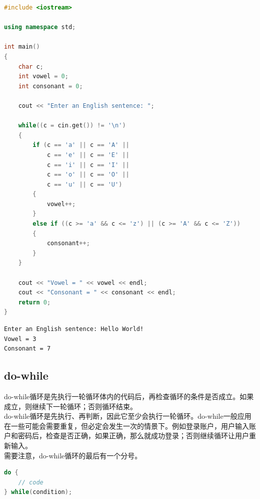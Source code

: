 \vspace{0.5cm}


\begin{lstlisting}[language=C++]
#include <iostream>

using namespace std;

int main()
{
    char c;
    int vowel = 0;
    int consonant = 0;

    cout << "Enter an English sentence: ";

    while((c = cin.get()) != '\n')
    {
        if (c == 'a' || c == 'A' ||
            c == 'e' || c == 'E' || 
            c == 'i' || c == 'I' || 
            c == 'o' || c == 'O' || 
            c == 'u' || c == 'U')
        {
            vowel++;
        }
        else if ((c >= 'a' && c <= 'z') || (c >= 'A' && c <= 'Z'))
        {
            consonant++;
        }
    }

    cout << "Vowel = " << vowel << endl;
    cout << "Consonant = " << consonant << endl;
    return 0;
}
\end{lstlisting}

\begin{tcolorbox}
    \begin{verbatim}
Enter an English sentence: Hello World!
Vowel = 3
Consonant = 7
\end{verbatim}
\end{tcolorbox}

\vspace{0.5cm}

\subsection{do-while}

do-while循环是先执行一轮循环体内的代码后，再检查循环的条件是否成立。如果成立，则继续下一轮循环；否则循环结束。\\

do-while循环是先执行、再判断，因此它至少会执行一轮循环。do-while一般应用在一些可能会需要重复，但必定会发生一次的情景下。例如登录账户，用户输入账户和密码后，检查是否正确，如果正确，那么就成功登录；否则继续循环让用户重新输入。\\

需要注意，do-while循环的最后有一个分号。

\vspace{-0.5cm}

\begin{lstlisting}[language=C++]
do {
    // code
} while(condition);
\end{lstlisting}

